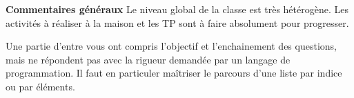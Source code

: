 \documentclass[10pt,fleqn]{article} %
\begin{document}

\pagestyle{fancy}
\thispagestyle{plain}


\def\columnseprulecolor{\color{ocre}}
\setlength{\columnseprule}{0.4pt} 



\vspace{6cm}


\textbf{Commentaires généraux}
Le niveau global de la classe est très hétérogène. Les activités à réaliser à la maison et les TP sont à faire absolument pour progresser.

Une partie d'entre vous ont compris l'objectif et l'enchainement des questions, mais ne répondent pas avec la rigueur demandée par un langage de programmation. 
Il faut en particuler maîtriser le parcours d'une liste par indice ou par éléments. 
\end{document}

